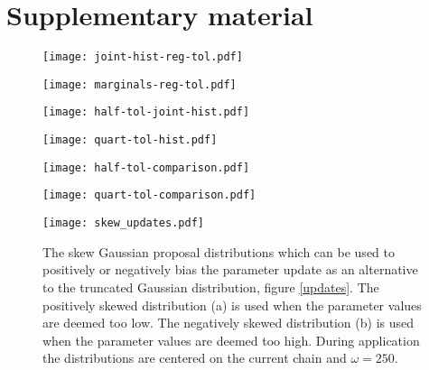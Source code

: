 \chapter{Supplementary material}

\begin{figure}[H]
	\centering
	\texttt{[image: joint-hist-reg-tol.pdf]}
	\caption{}
	\label{pdf-reg-tol}
\end{figure}

\begin{figure}[H]
	\centering
	\texttt{[image: marginals-reg-tol.pdf]}
	\caption{}
	\label{marginal-reg-tol}
\end{figure}

\begin{figure}[H]
	\centering
	\texttt{[image: half-tol-joint-hist.pdf]}
	\caption{}
	\label{pdf-half-tol}
\end{figure}

\begin{figure}[H]
	\centering
	\texttt{[image: quart-tol-hist.pdf]}
	\caption{}
	\label{pdf-quart-tol}
\end{figure}

\begin{figure}[H]
	\centering
	\texttt{[image: half-tol-comparison.pdf]}
	\caption{}
	\label{comparison-half-tol}
\end{figure}

\begin{figure}[H]
	\centering
	\texttt{[image: quart-tol-comparison.pdf]}
	\caption{}
	\label{comparison-quart-tol}
\end{figure}

\begin{figure}[H]
	\centering
	\texttt{[image: skew\_updates.pdf]}
	\caption{The skew Gaussian proposal distributions which can be used to positively or negatively bias the parameter update as an alternative to the truncated Gaussian distribution, figure \ref{updates}. The positively skewed distribution (a) is used when the parameter values are deemed too low. The negatively skewed distribution (b) is used when the parameter values are deemed too high. During application the distributions are centered on the current chain and $\omega = 250$.}
	\label{skew-updates}
\end{figure}

